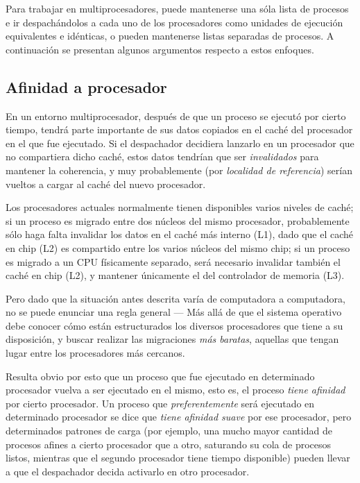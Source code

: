 \documentclass[11pt,fleqn]{book} %
\begin{document}
Para trabajar en multiprocesadores, puede mantenerse una sóla lista de
procesos e ir despachándolos a cada uno de los procesadores como
unidades de ejecución equivalentes e idénticas, o pueden mantenerse
listas separadas de procesos. A continuación se presentan algunos
argumentos respecto a estos enfoques.
\subsection{Afinidad a procesador}
\label{sec-4-4-1}


En un entorno multiprocesador, después de que un proceso se ejecutó
por cierto tiempo, tendrá parte importante de sus datos copiados en el
caché del procesador en el que fue ejecutado. Si el despachador
decidiera lanzarlo en un procesador que no compartiera dicho caché,
estos datos tendrían que ser \emph{invalidados} para mantener la
coherencia, y muy probablemente (por \emph{localidad de referencia}) serían
vueltos a cargar al caché del nuevo procesador.

Los procesadores actuales normalmente tienen disponibles varios
niveles de caché; si un proceso es migrado entre dos núcleos del mismo
procesador, probablemente sólo haga falta invalidar los datos en el
caché más interno (L1), dado que el caché en chip (L2) es compartido
entre los varios núcleos del mismo chip; si un proceso es migrado a
un CPU físicamente separado, será necesario invalidar también el
caché en chip (L2), y mantener únicamente el del controlador de
memoria (L3).

Pero dado que la situación antes descrita varía de computadora a
computadora, no se puede enunciar una regla general — Más allá de que
el sistema operativo debe conocer cómo están estructurados los
diversos procesadores que tiene a su disposición, y buscar realizar
las migraciones \emph{más baratas}, aquellas que tengan lugar entre los
procesadores más cercanos.

Resulta obvio por esto que un proceso que fue ejecutado en determinado
procesador vuelva a ser ejecutado en el mismo, esto es, el proceso
\emph{tiene afinidad} por cierto procesador. Un proceso que
\emph{preferentemente} será ejecutado en determinado procesador se dice que
\emph{tiene afinidad suave} por ese procesador, pero determinados patrones
de carga (por ejemplo, una mucho mayor cantidad de procesos afines a
cierto procesador que a otro, saturando su cola de procesos listos,
mientras que el segundo procesador tiene tiempo disponible) pueden
llevar a que el despachador decida activarlo en otro procesador.
\end{document}
